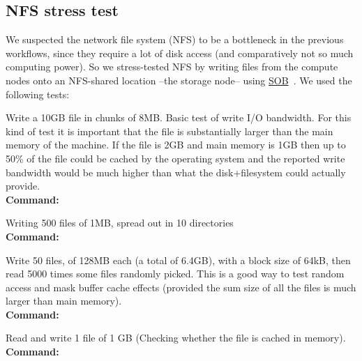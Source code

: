 \subsection{NFS stress test}
\label{experiments:NFS}

We suspected the network file system (NFS) to be a bottleneck in the
previous workflows, since they require a lot of disk access (and
comparatively not so much computing power). So we stress-tested NFS by
writing files from the compute nodes onto an NFS-shared location --the
storage node-- using
\href{https://www.pdc.kth.se/~pek/sob}{SOB}~\cite{sob}.
%
We used the following tests:

\begin{tests}
%
\item\label{experiments:SOB:test:big}%
  Write a 10GB file in chunks of 8MB. Basic test of write I/O
  bandwidth.  For this kind of test it is important that the file is
  substantially larger than the main memory of the machine. If the
  file is 2GB and main memory is 1GB then up to 50\% of the file could
  be cached by the operating system and the reported write bandwidth
  would be much higher than what the disk+filesystem could actually
  provide.
  \\\textbf{Command:}\ 
\item\label{experiments:SOB:test:dir}%
  Writing 500 files of 1MB, spread out in 10 directories
  \\\textbf{Command:}\ 
\item\label{experiments:SOB:test:random}%
  Write 50 files, of 128MB each (\ie a total of 6.4GB), with a block
  size of 64kB, then read 5000 times some files randomly picked. This
  is a good way to test random access and mask buffer cache effects
  (provided the sum size of all the files is much larger than main
  memory).
  \\\textbf{Command:}\ 
\item\label{experiments:SOB:test:cache}%
  Read and write 1 file of 1 GB (Checking whether the file is cached in memory).
  \\\textbf{Command:}\ 
\end{tests}

